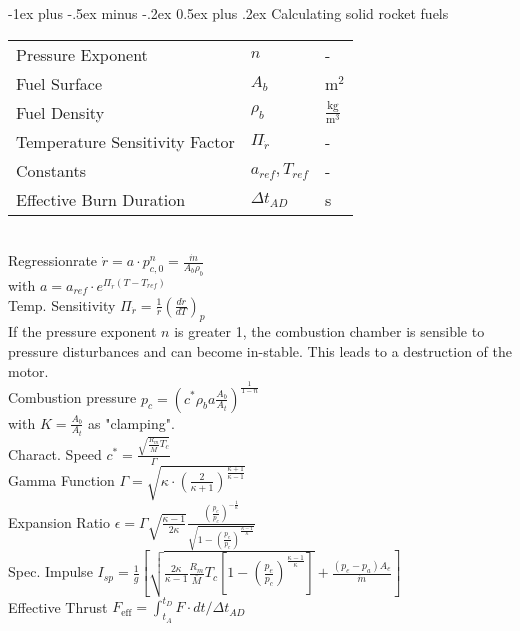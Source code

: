 \documentclass[10pt,landscape]{article}
\makeatletter
\renewcommand{\section}{\@startsection{section}{1}{0mm}%
                                {-1ex plus -.5ex minus -.2ex}%
                                {0.5ex plus .2ex}%
                                {\normalfont\large\bfseries}}
\makeatother
\begin{document}
\begin{multicols}{3}
\section{Calculating solid rocket fuels}
\begin{tabular}{lll}
	Pressure Exponent & $n$ & - \\
	Fuel Surface & $A_b$ & $\text{m}^2$ \\
	Fuel Density & $\rho_b$ & $\frac{\text{kg}}{\text{m}^3}$ \\
	Temperature Sensitivity Factor & $\Pi_{\dot{r}}$ & - \\
	Constants & $a_{ref}, T_{ref}$ & - \\
	Effective Burn Duration & $\Delta t_{AD}$ & s \\
\end{tabular}\\
\vspace{7pt}
Regressionrate $\dot{r}=a\cdot p_{c,0}^n = \frac{\dot{m}}{A_b\rho_b}$\\
with $a = a_{ref}\cdot e^{\Pi_{\dot{r}} (T-T_{ref})}$\\
Temp. Sensitivity $\Pi_{\dot{r}} = \frac{1}{\dot{r}} (\frac{d \dot{r}}{d T})_p$ \\
\vspace{5pt}
If the pressure exponent $n$ is greater 1, the combustion chamber is sensible to pressure disturbances and can become in-stable. This leads to a destruction of the motor.\\
\vspace{12pt}
Combustion pressure $p_c = (c^* \rho_b a \frac{A_b}{A_t})^\frac{1}{1-n}$\\
with $ K = \frac{A_b}{A_t}$ as "clamping".\\
\vspace{7pt}
Charact. Speed $c^* = \frac{\sqrt{\frac{R_m}{\bar{M}}T_c}}{\Gamma}$\\
Gamma Function $\Gamma = \sqrt{\kappa \cdot (\frac{2}{\kappa+1})^{\frac{\kappa+1}{\kappa-1}}}$\\
\vspace{7pt}
Expansion Ratio $\epsilon = \Gamma \sqrt{\frac{\kappa-1}{2 \kappa}} \frac{(\frac{p_e}{p_c})^{-\frac{1}{\kappa}}}{\sqrt{1-(\frac{p_e}{p_c})^\frac{\kappa-1}{\kappa}}}$\\
\vspace{7pt}
Spec. Impulse $I_{sp} = \frac{1}{g} \left[ \sqrt{\frac{2\kappa}{\kappa-1}\frac{R_m}{\bar{M}} T_c \left[1-(\frac{p_e}{p_c})^\frac{\kappa-1}{\kappa}\right]} + \frac{(p_e-p_a) A_e}{\dot{m}}\right]$\\
\vspace{12pt}
Effective Thrust $F_{\text{eff}}=\int_{t_A}^{t_D}F\cdot dt / \Delta t_{AD}$\\
\vspace{5pt}


\end{multicols}
\end{document}
